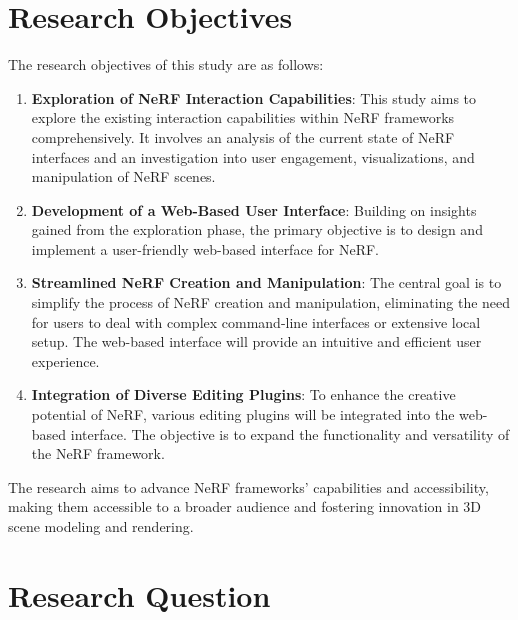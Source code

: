 \section{Research Objectives}
\label{sec:intro:objectives}

The research objectives of this study are as follows:

\begin{enumerate}
    \item \textbf{Exploration of NeRF Interaction Capabilities}: This study aims to explore the existing interaction capabilities within NeRF frameworks comprehensively. It involves an analysis of the current state of NeRF interfaces and an investigation into user engagement, visualizations, and manipulation of NeRF scenes.

    \item \textbf{Development of a Web-Based User Interface}: Building on insights gained from the exploration phase, the primary objective is to design and implement a user-friendly web-based interface for NeRF.

    \item \textbf{Streamlined NeRF Creation and Manipulation}: The central goal is to simplify the process of NeRF creation and manipulation, eliminating the need for users to deal with complex command-line interfaces or extensive local setup. The web-based interface will provide an intuitive and efficient user experience.

    \item \textbf{Integration of Diverse Editing Plugins}: To enhance the creative potential of NeRF, various editing plugins will be integrated into the web-based interface. The objective is to expand the functionality and versatility of the NeRF framework.
\end{enumerate}

The research aims to advance NeRF frameworks' capabilities and accessibility, making them accessible to a broader audience and fostering innovation in 3D scene modeling and rendering.


\section{Research Question}
\label{sec:intro:question}

